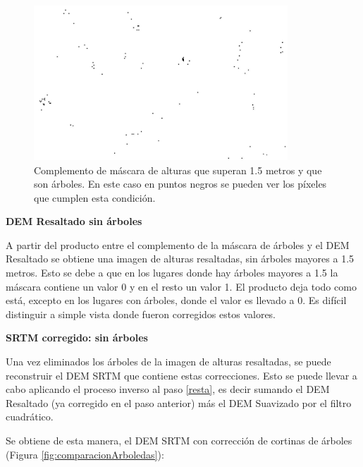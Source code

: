 \documentclass[10pt,a4paper, twoside]{report}
\begin{document}
\begin{figure}[H]
   \centering      
   \includegraphics[width=0.85\textwidth]{imagenes/maskTressHeightCompl.jpg}
 \caption{Complemento de máscara de alturas que superan 1.5 metros y que son árboles. En este caso en puntos negros se pueden ver los píxeles que cumplen esta condición.}
 \label{maskTressHeightCompl}
\end{figure}


\textbf{DEM Resaltado sin árboles}

A partir del producto entre el complemento de la máscara de árboles y el DEM Resaltado se obtiene una imagen de alturas resaltadas, sin árboles mayores a 1.5 metros. Esto se debe a que en los lugares donde hay árboles mayores a 1.5 la máscara contiene un valor 0 y en el resto un valor 1. El producto deja todo como está, excepto en los lugares con árboles, donde el valor es llevado a 0. Es difícil distinguir a simple vista donde fueron corregidos estos valores. 


\textbf{SRTM corregido: sin árboles}

Una vez eliminados los árboles de la imagen de alturas resaltadas, se puede reconstruir el DEM SRTM que contiene estas correcciones. Esto se puede llevar a cabo aplicando el proceso inverso al paso \ref{resta}, es decir sumando el DEM Resaltado (ya corregido en el paso anterior) más el DEM Suavizado por el filtro cuadrático.

Se obtiene de esta manera, el DEM SRTM con corrección de cortinas de árboles (Figura \ref{fig:comparacionArboledas}):
\end{document}
